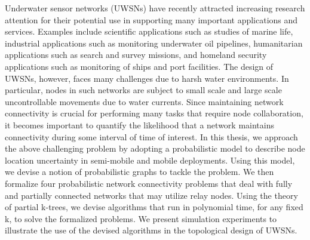 \documentclass[12pt, oneside]{Thesis} %
\begin{document}

Underwater sensor networks (UWSNs) have recently attracted increasing research attention for their potential use in supporting many important applications and services.
Examples include scientific applications such as studies of marine life, industrial applications such as monitoring underwater oil pipelines, humanitarian applications such as search and survey missions, and homeland security applications such as monitoring of ships and port facilities. 
The design of UWSNs, however, faces many challenges due to harsh water environments.
In particular, nodes in such networks are subject to small scale and large scale uncontrollable movements due to water currents.
Since maintaining network connectivity is crucial for performing many tasks that require node collaboration, it becomes important to quantify the likelihood that a network maintains connectivity during some interval of time of interest.
In this thesis, we approach the above challenging problem by adopting a probabilistic model to describe node location uncertainty in semi-mobile and mobile deployments. Using this model, we devise a notion of probabilistic graphs to tackle the problem.
We then formalize four probabilistic network connectivity problems that deal with fully and partially connected networks that may utilize relay nodes.
Using the theory of partial k-trees, we devise algorithms that run in polynomial time, for any fixed k, to solve the formalized problems.
We present simulation experiments to illustrate the use of the devised algorithms in the topological design of UWSNs.

\clearpage

\end{document}
